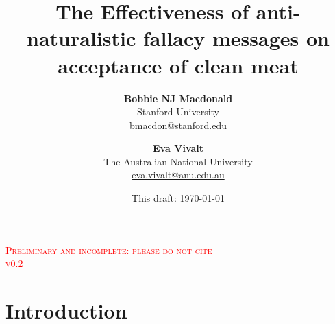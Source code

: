 \documentclass[12pt]{article}
\title{
    \vspace{-8mm}
    \Huge\selectfont\textbf{The Effectiveness of anti-naturalistic fallacy messages on acceptance of clean meat} \\[5mm] 
    \vspace{5mm}
}
\author{\textbf{Bobbie NJ Macdonald} \\
        Stanford University \\
        {\href{mailto:bmacdon@stanford.edu}{bmacdon@stanford.edu}} \\
    \and \textbf{Eva Vivalt} \\
        The Australian National University \\
        {\href{mailto:eva.vivalt@anu.edu.au}{eva.vivalt@anu.edu.au}} \\
}
\date{This draft: \today{}}
\newcommand{\todo}[1]{\textit{\textcolor{red}{$<$todo$>$ #1 $<$/todo$>$}}}
\begin{document}
\maketitle
\thispagestyle{empty}

\begin{centering}
    \Large \textsc{\textcolor{red}{Preliminary and incomplete: please do not cite}} \\
    \Large \textsc{\textcolor{red}{v0.2}} \\
    \vspace{10mm}
\end{centering}







\setcounter{page}{1}

\section{Introduction}
\label{sec:intro}

\end{document}

